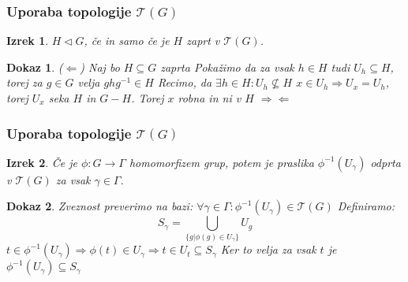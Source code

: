 \documentclass{beamer}
\newtheorem{izrek}{Izrek}
\newtheorem{dokaz}{Dokaz}
\begin{document}
\begin{frame}
    \frametitle{Uporaba topologije $\mathcal{T}(G)$}
    
    \begin{izrek}
        $H \triangleleft G$, če in samo če je $H$ zaprt v $\mathcal{T}(G)$.
    \end{izrek}
    
    \begin{dokaz}
        ($\Leftarrow$) Naj bo $H \subseteq G$ zaprta
        \newline
        \pause
        Pokažimo da za vsak $h \in H$ tudi $U_h \subseteq H$, torej za $g \in G$ velja $ghg^{-1} \in H$ %
        \newline
        \pause
        Recimo, da $\exists h \in H: U_h \nsubseteq H$
        \newline
        \pause
        $x \in U_h \Rightarrow U_x = U_h$, torej $U_x$ seka $H$ in $G - H$.
        \newline
        \pause
        Torej $x$ robna in ni v $H$
        \pause
        $\Rightarrow\!\Leftarrow$

    \end{dokaz}


\end{frame}



\begin{frame}
\frametitle{Uporaba topologije $\mathcal{T}(G)$}

\begin{izrek}
    Če je $\phi: G \rightarrow \Gamma$ homomorfizem grup, potem je praslika $\phi^{-1}(U_\gamma)$ odprta v $\mathcal{T}(G)$ za vsak $\gamma \in \Gamma$.
    \pause
\end{izrek}


\begin{dokaz}
    Zveznost preverimo na bazi: $\forall \gamma \in \Gamma: \phi^{-1}(U_\gamma) \in \mathcal{T}(G)$
    \newline
    \pause
    Definiramo:
    \[ S_\gamma = \bigcup_{\{g | \phi(g) \in U_\gamma\}} U_g \]
    \pause
    $t \in \phi^{-1}(U_\gamma) \Rightarrow \phi(t) \in U_\gamma \Rightarrow t \in U_t \subseteq S_\gamma$
    \newline
    \pause
    Ker to velja za vsak $t$ je {\color{red} $\phi^{-1}(U_\gamma) \subseteq S_\gamma$}
    
\end{dokaz}
\end{frame}
\end{document}

